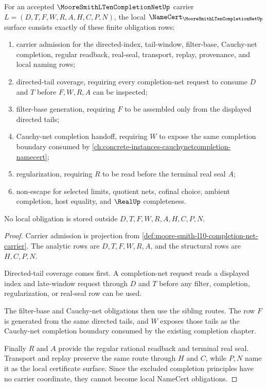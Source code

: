 \begin{theorem}\label{thm:moore-smith-l10-completion-net-namecert-obligations}
For an accepted $\MooreSmithLTenCompletionNetUp$ carrier $L=(D,T,F,W,R,A,H,C,P,N)$, the local $\NameCert_{\MooreSmithLTenCompletionNetUp}$ surface consists exactly of these finite obligation rows:
\begin{enumerate}
\item carrier admission for the directed-index, tail-window, filter-base, Cauchy-net completion, regular readback, real-seal, transport, replay, provenance, and local naming rows;
\item directed-tail coverage, requiring every completion-net request to consume $D$ and $T$ before $F,W,R,A$ can be inspected;
\item filter-base generation, requiring $F$ to be assembled only from the displayed directed tails;
\item Cauchy-net completion handoff, requiring $W$ to expose the same completion boundary consumed by \autoref{ch:concrete-instances-cauchynetcompletion-namecert};
\item regularization, requiring $R$ to be read before the terminal real seal $A$;
\item non-escape for selected limits, quotient nets, cofinal choice, ambient completion, host equality, and $\RealUp$ completeness.
\end{enumerate}
No local obligation is stored outside $D,T,F,W,R,A,H,C,P,N$.
\end{theorem}
\begin{proof}
Carrier admission is projection from \autoref{def:moore-smith-l10-completion-net-carrier}. The analytic rows are $D,T,F,W,R,A$, and the structural rows are $H,C,P,N$.

Directed-tail coverage comes first. A completion-net request reads a displayed index and late-window request through $D$ and $T$ before any filter, completion, regularization, or real-seal row can be used.

The filter-base and Cauchy-net obligations then use the sibling routes. The row $F$ is generated from the same directed tails, and $W$ exposes those tails as the Cauchy-net completion boundary consumed by the existing completion chapter.

Finally $R$ and $A$ provide the regular rational readback and terminal real seal. Transport and replay preserve the same route through $H$ and $C$, while $P,N$ name it as the local certificate surface. Since the excluded completion principles have no carrier coordinate, they cannot become local NameCert obligations.
\end{proof}

